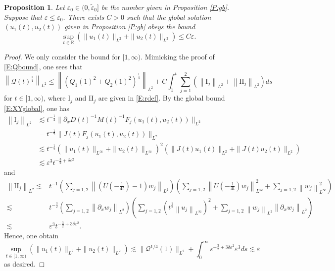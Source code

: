\documentclass[11pt,a4paper,oneside]{amsart}
\theoremstyle{plain}
\newtheorem{proposition}[theorem]{Proposition}
\theoremstyle{remark}
\numberwithin{equation}{section}
\newcommand{\R}{\mathbb{R}}
\newcommand{\norm}[1]{\left\lVert #1\right\rVert}
\def\({\left(}
\def\){\right)}
\def\le{\leqslant}
\newcommand{\eps}{\varepsilon}
\theoremstyle{definition}
\begin{document}
\begin{proposition}\label{P:gb2}
Let  $\eps_0\in (0,\widetilde{\eps}_0]$ be the number given in Proposition \ref{P:gb}.
Suppose that $\eps\le \eps_0$.
There exists $C>0$ such that
the global solution $(u_1(t),u_2(t))$ given in Proposition \ref{P:gb} obeys the bound
\begin{equation}\label{E:L2global}
	\sup_{t\in \R} (\| u_1(t)\|_{L^2}+\| u_2(t)\|_{L^2})
	\le C \eps.
\end{equation}
\end{proposition}
\begin{proof}
We only consider the bound for $[1,\infty)$.
Mimicking the proof of \eqref{E:Qbound}, one sees that
\[
	\norm{\mathcal{Q}(t)^\frac14}_{L^2}
	\le \norm{(Q_1(1)^2 + Q_2(1)^2)^\frac14}_{L^2}
+C\int_1^t \sum_{j=1}^2(\norm{\mathrm{I}_j}_{L^2} + \norm{\mathrm{II}_j}_{L^2} ) ds
\]
for $t\in [1,\infty)$,
where $\mathrm{I}_j$ and $\mathrm{II}_j$ are given in \eqref{E:rdef}.
By the global bound \eqref{E:XYglobal}, one has
\begin{align*}
	\norm{\mathrm{I}_j}_{L^2}
	& \lesssim t^{-\frac12} \| \partial_x D(t)^{-1} M(t)^{-1} F_j(u_1(t),u_2(t))\|_{L^2} \\
& = t^{-\frac12} \| J(t) F_j(u_1(t),u_2(t))\|_{L^2} \\
&\lesssim t^{-\frac12} (\|u_1(t)\|_{L^\infty}+\|u_2(t)\|_{L^\infty})^2(\|J(t)u_1(t)\|_{L^2}+\|J(t)u_2(t)\|_{L^2})\\
&\lesssim \eps^3 t^{-\frac32 + \delta \eps^2}
\end{align*}
and
\begin{align*}
	\norm{\mathrm{II}_j}_{L^2}
	\lesssim{}& 	t^{-1} \(\sum_{j=1,2} \norm{(U(-\tfrac1{4t})-1) w_j}_{L^2}\)
\(\sum_{j=1,2} \norm{U(-\tfrac1{4t}) w_j}_{L^\infty}^2 + \sum_{j=1,2} \norm{w_j}_{L^\infty}^2\)
 \\
	\lesssim{}& t^{-\frac32} \(\sum_{j=1,2} \norm{\partial_x w_j}_{L^2}\) 
\(\sum_{j=1,2} (t^{\frac12} \norm{u_j}_{L^\infty})^2 + \sum_{j=1,2} \norm{w_j}_{L^2} \norm{\partial_x w_j}_{L^2}\)
\\
	\lesssim{}& \eps^3 t^{-\frac32+3\delta \eps^2} .
\end{align*}
Hence, one obtain
\[
		\sup_{t\in [1,\infty)} (\| u_1(t)\|_{L^2}+\| u_2(t)\|_{L^2})
	\lesssim \| \mathcal{Q}^{1/4}(1)\|_{L^2} + \int_0^\infty s^{-\frac32 + 3\delta \eps^2} \eps^3 ds \lesssim \eps
\]
as desired.
\end{proof}
\end{document}
